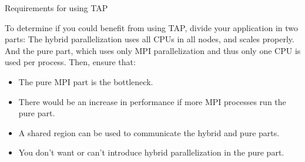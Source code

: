 \documentclass{beamer}
\begin{document}
\begin{frame}{Requirements for using TAP}

To determine if you could benefit from using TAP, divide your application in two 
parts: The hybrid parallelization uses all CPUs in all nodes, and scales 
properly. And the pure part, which uses only MPI parallelization and thus only 
one CPU is used per process.  Then, ensure that:
\vspace{1em}

\begin{itemize}
\item The pure MPI part is the bottleneck.
\item There would be an increase in performance if more MPI processes run the 
pure part.
\item A shared region can be used to communicate the hybrid and pure parts.
\item You don't want or can't introduce hybrid parallelization in the pure part.
\end{itemize}

\end{frame}
\end{document}
